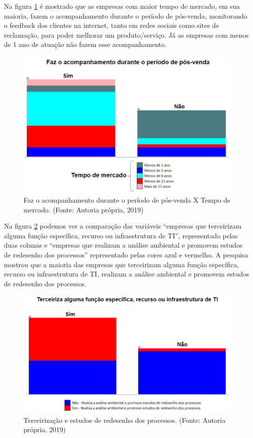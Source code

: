 Na figura \ref{fig:grafico410} é mostrado que as empresas com maior tempo de mercado, em sua maioria, fazem o acompanhamento durante o período de pós-venda, monitorando o feedback dos clientes na internet, tanto em redes sociais como sites de reclamação, para poder melhorar um produto/serviço. Já as empresas com menos de 1 ano de atuação não fazem esse acompanhamento.

\begin{figure}[H]

\centering
\includegraphics[width=13cm]{./fig/grafico06}
\caption{Faz o acompanhamento durante o período de pós-venda X Tempo de mercado. (Fonte: Autoria própria, 2019)}
\label{fig:grafico410}
\end{figure}

Na figura \ref{fig:grafico413} podemos ver a comparação das variáveis  “empresas que terceirizam alguma função específica, recurso ou infraestrutura de TI”, representado pelas duas colunas e “empresas que realizam a análise ambiental e promovem estudos de redesenho dos processos” representado pelas cores azul e vermelho. A pesquisa mostrou que a maioria das empresas que terceirizam alguma função específica, recurso ou infraestrutura de TI, realizam a análise ambiental e promovem estudos de redesenho dos processos. 

\begin{figure}[H]

\centering
\includegraphics[width=13cm]{./fig/grafico11}
\caption{Terceirização e estudos de redesenho dos processos. (Fonte: Autoria própria, 2019)}
\label{fig:grafico413}
\end{figure}
	
